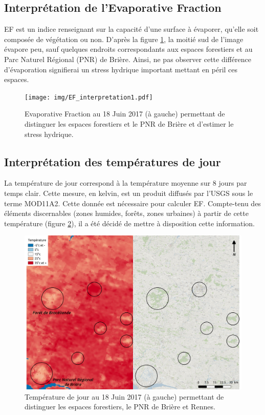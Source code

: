\documentclass[10pt,a4paper]{article}
\begin{document}
\subsection{Interprétation de l'Evaporative Fraction}

EF est un indice renseignant sur la capacité d'une
surface à évaporer, qu’elle soit composée de végétation ou non. D'après la figure \ref{EF1}, la moitié sud de l'image évapore peu, sauf quelques endroits correspondants aux espaces forestiers et au Parc Naturel Régional (PNR) de Brière. Ainsi, ne pas observer cette différence d'évaporation signifierai un stress hydrique important mettant en péril ces espaces.

\begin{figure}[!h]
\centering
\texttt{[image: img/EF\_interpretation1.pdf]}
\caption{Evaporative Fraction au 18 Juin 2017 (à gauche) permettant de distinguer les espaces forestiers et le PNR de Brière et d'estimer le stress hydrique.}
\label{EF1}
\end{figure}

\newpage 

\subsection{Interprétation des températures de jour}

La température de jour correspond à la température moyenne sur 8 jours par temps clair. Cette mesure, en kelvin, est un produit diffusés par l'USGS sous le terme MOD11A2. Cette donnée est nécessaire pour calculer EF. Compte-tenu des éléments discernables (zones humides, forêts, zones urbaines) à partir de cette température (figure \ref{TJ1}), il a été décidé de mettre à disposition cette information. \smallbreak

\begin{figure}[!h]
\centering
\includegraphics[scale=0.33]{img/TJ_interpretation1.pdf}
\caption{Température de jour au 18 Juin 2017 (à gauche) permettant de distinguer les espaces forestiers, le PNR de Brière et Rennes.}
\label{TJ1}
\end{figure}
\end{document}
